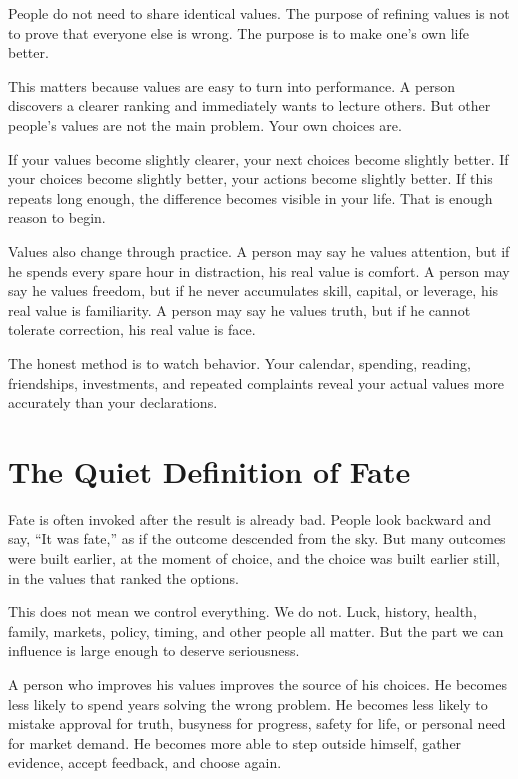 People do not need to share identical values. The purpose of refining values is not to prove that everyone else is wrong. The purpose is to make one's own life better.

This matters because values are easy to turn into performance. A person discovers a clearer ranking and immediately wants to lecture others. But other people's values are not the main problem. Your own choices are.

If your values become slightly clearer, your next choices become slightly better. If your choices become slightly better, your actions become slightly better. If this repeats long enough, the difference becomes visible in your life. That is enough reason to begin.

Values also change through practice. A person may say he values attention, but if he spends every spare hour in distraction, his real value is comfort. A person may say he values freedom, but if he never accumulates skill, capital, or leverage, his real value is familiarity. A person may say he values truth, but if he cannot tolerate correction, his real value is face.

The honest method is to watch behavior. Your calendar, spending, reading, friendships, investments, and repeated complaints reveal your actual values more accurately than your declarations.

\section*{The Quiet Definition of Fate}

Fate is often invoked after the result is already bad. People look backward and say, ``It was fate,'' as if the outcome descended from the sky. But many outcomes were built earlier, at the moment of choice, and the choice was built earlier still, in the values that ranked the options.

This does not mean we control everything. We do not. Luck, history, health, family, markets, policy, timing, and other people all matter. But the part we can influence is large enough to deserve seriousness.

A person who improves his values improves the source of his choices. He becomes less likely to spend years solving the wrong problem. He becomes less likely to mistake approval for truth, busyness for progress, safety for life, or personal need for market demand. He becomes more able to step outside himself, gather evidence, accept feedback, and choose again.

